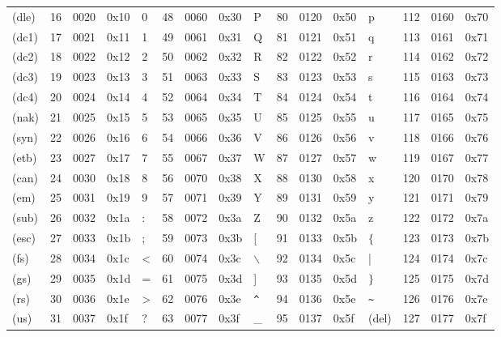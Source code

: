 \documentclass{article}
\begin{document}
\begin{tabular}{lrll|lrll|lrll|lrll}
		(dle) & 16 & 0020 & 0x10 & 0 & 48 & 0060 & 0x30 & P & 80 & 0120 & 0x50 & p & 112 & 0160 & 0x70\\
		(dc1) & 17 & 0021 & 0x11 & 1 & 49 & 0061 & 0x31 & Q & 81 & 0121 & 0x51 & q & 113 & 0161 & 0x71\\
		(dc2) & 18 & 0022 & 0x12 & 2 & 50 & 0062 & 0x32 & R & 82 & 0122 & 0x52 & r & 114 & 0162 & 0x72\\
		(dc3) & 19 & 0023 & 0x13 & 3 & 51 & 0063 & 0x33 & S & 83 & 0123 & 0x53 & s & 115 & 0163 & 0x73\\
		(dc4) & 20 & 0024 & 0x14 & 4 & 52 & 0064 & 0x34 & T & 84 & 0124 & 0x54 & t & 116 & 0164 & 0x74\\
		(nak) & 21 & 0025 & 0x15 & 5 & 53 & 0065 & 0x35 & U & 85 & 0125 & 0x55 & u & 117 & 0165 & 0x75\\
		(syn) & 22 & 0026 & 0x16 & 6 & 54 & 0066 & 0x36 & V & 86 & 0126 & 0x56 & v & 118 & 0166 & 0x76\\
		(etb) & 23 & 0027 & 0x17 & 7 & 55 & 0067 & 0x37 & W & 87 & 0127 & 0x57 & w & 119 & 0167 & 0x77\\
		(can) & 24 & 0030 & 0x18 & 8 & 56 & 0070 & 0x38 & X & 88 & 0130 & 0x58 & x & 120 & 0170 & 0x78\\
		(em) & 25 & 0031 & 0x19 & 9 & 57 & 0071 & 0x39 & Y & 89 & 0131 & 0x59 & y & 121 & 0171 & 0x79\\
		(sub) & 26 & 0032 & 0x1a & : & 58 & 0072 & 0x3a & Z & 90 & 0132 & 0x5a & z & 122 & 0172 & 0x7a\\
		(esc) & 27 & 0033 & 0x1b & ; & 59 & 0073 & 0x3b & [ & 91 & 0133 & 0x5b & $\{$ & 123 & 0173 & 0x7b\\
		(fs) & 28 & 0034 & 0x1c & < & 60 & 0074 & 0x3c & $\backslash$ & 92 & 0134 & 0x5c & | & 124 & 0174 & 0x7c\\
		(gs) & 29 & 0035 & 0x1d & = & 61 & 0075 & 0x3d & ] & 93 & 0135 & 0x5d & $\}$ & 125 & 0175 & 0x7d\\
		(rs) & 30 & 0036 & 0x1e & > & 62 & 0076 & 0x3e & \verb+^+ & 94 & 0136 & 0x5e & \verb+~+ & 126 & 0176 & 0x7e\\
		(us) & 31 & 0037 & 0x1f & ? & 63 & 0077 & 0x3f & \_ & 95 & 0137 & 0x5f & (del) & 127 & 0177 & 0x7f\\
		\hline
		\end{tabular}
\end{document}
